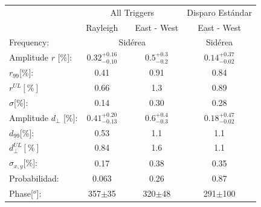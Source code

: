 \documentclass[12pt, doublespace, oneside]{article}
\begin{document}
    \begin{table}[H]
        \vspace*{-0.51 cm}
        \begin{small}
            \begin{center}
                \begin{tabular}[c]{l|c|c|c||c|}
                    \cline{2-5}                 & \multicolumn{3}{c||}{All Triggers}                  & Disparo Estándar      \\
                    \cline{2-5}                 & Rayleigh               &       & East - West                 & East - West\cite{Aab_2020}      \\\hline
\multicolumn{1}{|l|}{Frequency:             }  & \multicolumn{3}{c||}{Sidérea}                               & Sidérea        \\ \hline
\multicolumn{1}{|l|}{Amplitude $r$ [\%]:      }  & $0.32^{+0.16}_{-0.10}$ &  	    & $0.5^{+0.3}_{-0.2}$         & $0.14^{+0.37}_{-0.02}$\cite{codigo}       \\
\multicolumn{1}{|l|}{$r_{99}$[\%]:           }  & 0.41	                 &         & 0.91                        & 0.84\cite{codigo}        \\
\multicolumn{1}{|l|}{$r^{UL}[\%]$      }        & 0.66                   &         & 1.3                         & 0.89 \cite{codigo}        \\
\multicolumn{1}{|l|}{$\sigma$[\%]:     }        & 0.14                   &         & 0.30	                    & 0.28 \cite{codigo}          \\ \hline
\multicolumn{1}{|l|}{Amplitude $d_\perp$ [\%]:}  & $0.41^{+0.20}_{-0.13}$ &         & $0.6^{+0.4}_{-0.3}$         & $0.18^{+0.47}_{-0.02}$       \\ 
\multicolumn{1}{|l|}{$d_{99}$[\%]:           }  & 0.53	                 &        & 1.1                         & 1.1\cite{codigo}        \\
\multicolumn{1}{|l|}{$d_{\perp}^{UL}[\%]$    }  & 0.84                   &         & 1.6                         & 1.1        \\
\multicolumn{1}{|l|}{$\sigma_{x,y}$[\%]:     }  & 0.17                   &         & 0.38	                    & 0.35          \\ \hline
\multicolumn{1}{|l|}{Probabilidad:           }  & 0.063	                 &            & 0.26                        & 0.87          \\
\multicolumn{1}{|l|}{Phase[$^o$]:             }  & 357$\pm$35             &        & 320$\pm$48                 & 291$\pm$100      \\\hline

\end{tabular}
\end{center}
\end{small}
\end{table}
\end{document}
